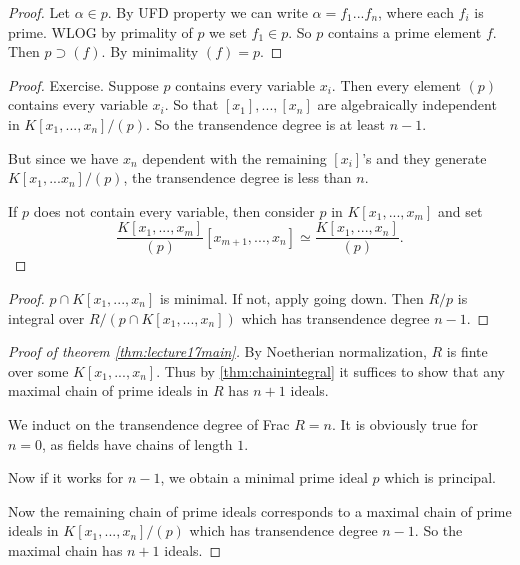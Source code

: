 \begin{proof}
    Let $\alpha\in p$. By UFD property we can write $\alpha=f_1...f_n$, where each $f_i$ is prime. WLOG by primality of $p$ we set $f_1\in p$. So $p$ contains a prime element $f$. Then $p\supset (f)$. By minimality $(f)=p$.
\end{proof}
\begin{proof}
    Exercise. Suppose $p$ contains every variable $x_i$. Then every element $(p)$ contains every variable $x_i$. So that $[x_1],...,[x_n]$ are algebraically independent in $K[x_1,...,x_n]/(p)$. So the transendence degree is at least $n-1$. 

    But since we have $x_n$ dependent with the remaining $[x_i]$'s and they generate $K[x_1,...x_n]/(p)$, the transendence degree is less than $n$. 

    If $p$ does not contain every variable, then consider $p$ in $K[x_1,...,x_m]$ and set \[\frac{K[x_1,...,x_m]}{(p)}[x_{m+1},...,x_n]\simeq \frac{K[x_1,...,x_n]}{(p)}.\]
\end{proof}
\begin{proof}
    $p\cap K[x_1,...,x_n]$ is minimal. If not, apply going down. Then $R/p$ is integral over $R/( p \cap K[x_1,...,x_n])$ which has transendence degree $n-1$.
\end{proof}
\begin{proof}[Proof of theorem \ref{thm:lecture17main}]
    By Noetherian normalization, $R$ is finte over some $K[x_1,...,x_n]$. Thus by \ref{thm:chainintegral} it suffices to show that any maximal chain of prime ideals in $R$ has $n+1$ ideals. 

    We induct on the transendence degree of Frac $R=n$. It is obviously true for $n=0$, as fields have chains of length $1$. 

    Now if it works for $n-1$, we obtain a minimal prime ideal $p$ which is principal. 

    Now the remaining chain of prime ideals corresponds to a maximal chain of prime ideals in $K[x_1,...,x_n]/(p)$ which has transendence degree $n-1$. So the maximal chain has $n+1$ ideals.
\end{proof}

